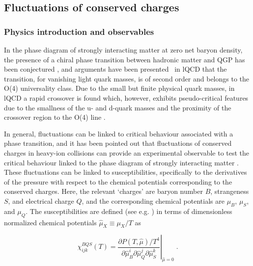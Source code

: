 \subsection{Fluctuations of conserved charges} 
\label{sec:fluctuations}
\subsubsection{Physics introduction and observables}

In the phase diagram of strongly interacting matter at zero net baryon density, the presence of a chiral phase transition between hadronic matter and QGP has been conjectured \cite{Pisarski:1983ms}, and arguments have been presented~\cite{Ejiri:2009ac,Ding:2018auz} in lQCD that the transition, for vanishing light quark masses, is of second order and belongs to the O(4) universality class. Due to the small but finite physical quark masses, in lQCD a rapid crossover is found \cite{Aoki:2006we,Aoki:2009sc,Borsanyi:2010bp,Bazavov:2011nk,Bhattacharya:2014ara} which, however, exhibits pseudo-critical features due to the smallness of the u- and d-quark masses and the proximity of the crossover region to the O(4) line \cite{Ejiri:2009ac,Ding:2013lfa}. 

In general, fluctuations can be linked to critical behaviour associated with a phase transition, and it has been pointed out that fluctuations of conserved charges in heavy-ion collisions can provide an experimental observable to test the critical behaviour linked to the phase diagram of strongly interacting matter \cite{Ejiri:2005wq,Bazavov:2017dus,Friman:2011pf,Bazavov:2012jq}. These fluctuations can be linked to susceptibilities, specifically to the derivatives of the pressure with respect to the chemical potentials corresponding to the conserved charges. Here, the relevant `charges' are baryon number $B$, strangeness $S$, and electrical charge $Q$, and the corresponding chemical potentials are $\mu_B$, $\mu_S$, and $\mu_Q$. The susceptibilities are defined (see e.g. \cite{Bazavov:2012jq,Bellwied:2015lba}) in terms of dimensionless normalized chemical potentials \(\hat{\mu}_X\equiv \mu_X/T \) \: as

\begin{equation}
\chi_{ijk}^{BQS}(T) = \left.
\frac{\partial P(T,\hat{\mu})/T^4}{\partial\hat{\mu}_B^i \partial\hat{\mu}_Q^j \partial\hat{\mu}_S^k}\right|_{\hat{\mu}=0} \; .
\label{suscept}
\end{equation} 

